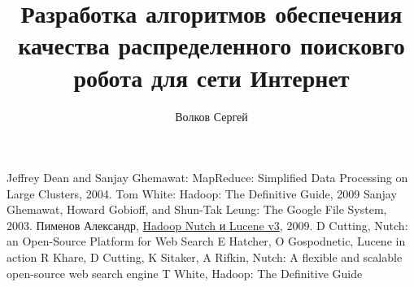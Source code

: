 \documentclass[a4paper,10pt]{report}
\title{Разработка алгоритмов обеспечения качества распределенного поисковго робота для сети Интернет}
\author{Волков Сергей}
\begin{document}
\maketitle



%
%
%

\begin{thebibliography}{9}
 Jeffrey Dean and Sanjay Ghemawat: MapReduce: Simplified Data Processing on Large Clusters, 2004.
 Tom White: Hadoop: The Definitive Guide, 2009
 Sanjay Ghemawat, Howard Gobioff, and Shun-Tak Leung: The Google File System, 2003.
 Пименов Александр, \href{http://mmcg.z52.ru/drupal/node/3}{Hadoop Nutch и Lucene v3}, 2009.
 D Cutting, Nutch: an Open-Source Platform for Web Search
 E Hatcher, O Gospodnetic, Lucene in action
 R Khare, D Cutting, K Sitaker, A Rifkin, Nutch: A flexible and scalable open-source web search engine
 T White, Hadoop: The Definitive Guide

\end{thebibliography}
\end{document}
